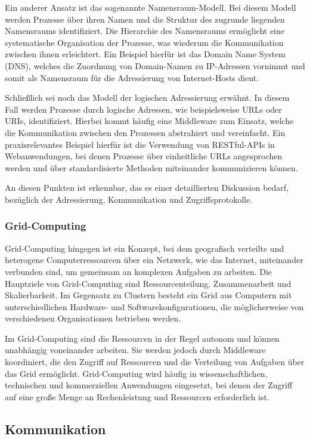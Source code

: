 \documentclass[../vs-script-first-v01.tex]{subfiles}
\begin{document}
Ein anderer Ansatz ist das sogenannte Namensraum-Modell. Bei diesem Modell werden Prozesse über ihren Namen und die Struktur des zugrunde liegenden Namensraums identifiziert. Die Hierarchie des Namensraums ermöglicht eine systematische Organisation der Prozesse, was wiederum die Kommunikation zwischen ihnen erleichtert. Ein Beispiel hierfür ist das Domain Name System (DNS), welches die Zuordnung von Domain-Namen zu IP-Adressen vornimmt und somit als Namensraum für die Adressierung von Internet-Hosts dient.

Schließlich sei noch das Modell der logischen Adressierung erwähnt. In diesem Fall werden Prozesse durch logische Adressen, wie beispielsweise URLs oder URIs, identifiziert. Hierbei kommt häufig eine Middleware zum Einsatz, welche die Kommunikation zwischen den Prozessen abstrahiert und vereinfacht. Ein praxisrelevantes Beispiel hierfür ist die Verwendung von RESTful-APIs in Webanwendungen, bei denen Prozesse über einheitliche URLs angesprochen werden und über standardisierte Methoden miteinander kommunizieren können.

An diesen Punkten ist erkennbar, das es einer detaillierten Diskussion bedarf, bezüglich der Adressierung, Kommunikation und Zugriffsprotokolle.
\subsubsection{Grid-Computing }
Grid-Computing hingegen ist ein Konzept, bei dem geografisch verteilte und heterogene Computerressourcen über ein Netzwerk, wie das Internet, miteinander verbunden sind, um gemeinsam an komplexen Aufgaben zu arbeiten. Die Hauptziele von Grid-Computing sind Ressourcenteilung, Zusammenarbeit und Skalierbarkeit. Im Gegensatz zu Clustern besteht ein Grid aus Computern mit unterschiedlichen Hardware- und Softwarekonfigurationen, die möglicherweise von verschiedenen Organisationen betrieben werden.

Im Grid-Computing sind die Ressourcen in der Regel autonom und können unabhängig voneinander arbeiten. Sie werden jedoch durch Middleware koordiniert, die den Zugriff auf Ressourcen und die Verteilung von Aufgaben über das Grid ermöglicht. Grid-Computing wird häufig in wissenschaftlichen, technischen und kommerziellen Anwendungen eingesetzt, bei denen der Zugriff auf eine große Menge an Rechenleistung und Ressourcen erforderlich ist.

\label{Woche07}

\newpage
\subsection{Kommunikation}
\end{document}
